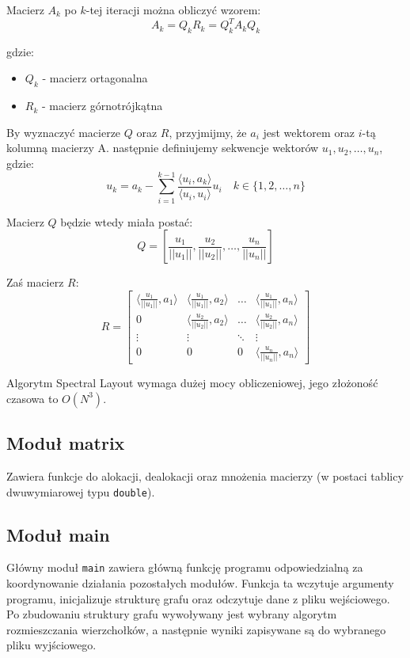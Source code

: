 \documentclass[11pt,a4paper]{article}
\begin{document}
Macierz $A_k$ po $k$-tej iteracji można obliczyć wzorem:
\[A_k = Q_k R_k = Q_k^T A_k Q_k\]

\noindent gdzie:
\begin{itemize}
	\item $Q_k$ - macierz ortagonalna
	\item $R_k$ - macierz górnotrójkątna
\end{itemize}

\noindent By wyznaczyć macierze $Q$ oraz $R$, przyjmijmy, że $a_i$ jest wektorem oraz $i$-tą kolumną macierzy A. następnie definiujemy sekwencje wektorów $u_1, u_2, \dots, u_n$, gdzie:
\[u_k = a_k - \sum_{i=1}^{k-1}{\frac{\langle u_i,a_k \rangle}{\langle u_i, u_i \rangle} u_i} \quad k \in \{1, 2, \dots, n\}\]

\noindent Macierz $Q$ będzie wtedy miała postać:
\[Q = [\frac{u_1}{||u_1||}, \frac{u_2}{||u_2||}, \dots, \frac{u_n}{||u_n||}]\]

\noindent Zaś macierz $R$:
\[R = \begin{bmatrix}
	\langle \frac{u_1}{||u_1||}, a_1 \rangle & \langle \frac{u_1}{||u_1||}, a_2 \rangle & \dots & \langle \frac{u_1}{||u_1||}, a_n \rangle \\
	0 & \langle \frac{u_2}{||u_2||}, a_2 \rangle & \dots & \langle \frac{u_2}{||u_2||}, a_n \rangle \\
	\vdots & \vdots & \ddots & \vdots \\
	0 & 0 & 0 & \langle \frac{u_n}{||u_n||}, a_n \rangle
\end{bmatrix}\]

Algorytm Spectral Layout wymaga dużej mocy obliczeniowej, jego złożoność czasowa to $O(N^3)$.

\subsection{Moduł matrix}
Zawiera funkcje do alokacji, dealokacji oraz mnożenia macierzy (w postaci tablicy dwuwymiarowej typu \verb|double|).

\subsection{Moduł main}

Główny moduł \verb|main| zawiera główną funkcję programu odpowiedzialną za koordynowanie działania pozostałych modułów. Funkcja ta wczytuje argumenty programu, inicjalizuje strukturę grafu oraz odczytuje dane z pliku wejściowego. Po zbudowaniu struktury grafu wywoływany jest wybrany algorytm rozmieszczania wierzchołków, a następnie wyniki zapisywane są do wybranego pliku wyjściowego.
\end{document}
